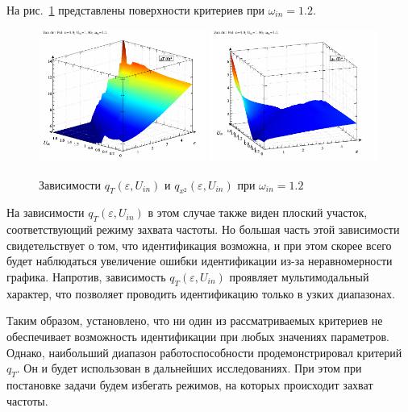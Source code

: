 На  рис.~\ref{atu:f:vdp_q2_120}
представлены поверхности критериев при $\omega_{in}=1.2$.

\begin{figure}[ht!]
\begin{center}
  \includegraphics[width=0.49\textwidth]{p/cha/vdp/vdp_q_2d-p_qT_ome_1x20.png}
  \hfill
  \includegraphics[width=0.49\textwidth]{p/cha/vdp/vdp_q_2d-p_qx2_ome_1x20.png}
\end{center}
  \caption{Зависимости $q_T(\varepsilon,U_{in})$ и $q_{x^2}(\varepsilon,U_{in})$  при $\omega_{in}=1.2$}
\label{atu:f:vdp_q2_120}
\end{figure}

На зависимости $q_T(\varepsilon,U_{in})$ в этом случае также виден
плоский участок, соответствующий режиму захвата частоты.
Но большая часть этой зависимости свидетельствует о том, что
идентификация возможна, и при этом скорее всего
будет наблюдаться увеличение ошибки идентификации из-за неравномерности графика.
Напротив, зависимость $q_T(\varepsilon,U_{in})$ проявляет
мультимодальный характер, что позволяет проводить идентификацию только в узких диапазонах.

Таким образом, установлено, что ни один из рассматриваемых критериев не
обеспечивает возможность идентификации при любых значениях параметров.
Однако, наибольший диапазон работоспособности продемонстрировал критерий $q_{T}$.
Он и будет использован в дальнейших исследованиях. При этом при постановке задачи
будем избегать режимов, на которых происходит захват частоты.









